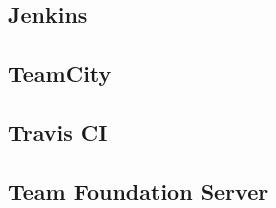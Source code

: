 \subsection{Jenkins}

\subsection{TeamCity}

\subsection{Travis CI}

\subsection{Team Foundation Server}




